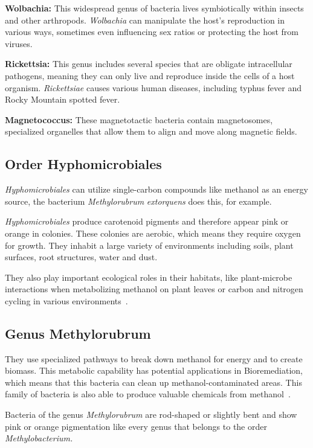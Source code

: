 \textbf{Wolbachia:} This widespread genus of bacteria lives symbiotically within insects and other arthropods.
\emph{Wolbachia} can manipulate the host's reproduction in various ways, sometimes even influencing sex ratios or protecting the host from viruses.

\textbf{Rickettsia:} This genus includes several species that are obligate intracellular pathogens, meaning they can only live and reproduce inside the cells of a host organism.
\emph{Rickettsiae} causes various human diseases, including typhus fever and Rocky Mountain spotted fever.

\textbf{Magnetococcus:} These magnetotactic bacteria contain magnetosomes, specialized
organelles that allow them to align and move along magnetic fields.

\subsection{Order Hyphomicrobiales}
\emph{Hyphomicrobiales} can utilize single-carbon compounds like methanol as an energy
source, the bacterium \emph{Methylorubrum} \emph{extorquens} does this, for example.

\emph{Hyphomicrobiales} produce carotenoid pigments and therefore appear pink or orange in colonies.
These colonies are aerobic, which means they require oxygen for growth.
They inhabit a large variety of environments including soils, plant surfaces, root structures, water and dust.

They also play important ecological roles in their habitats, like plant-microbe interactions when metabolizing methanol on plant leaves or carbon and nitrogen cycling in various environments~\cite{methylobacteria_groups}.

\subsection{Genus Methylorubrum}
They use specialized pathways to break down methanol for energy and to create biomass.
This metabolic capability has potential applications in Bioremediation, which
means that this bacteria can clean up methanol-contaminated areas.
This family of bacteria is also able to produce valuable chemicals from methanol~\cite{new_methylorubrum}.

Bacteria of the genus \emph{Methylorubrum} are rod-shaped or slightly bent and show pink or
orange pigmentation like every genus that belongs to the order \emph{Methylobacterium.}

